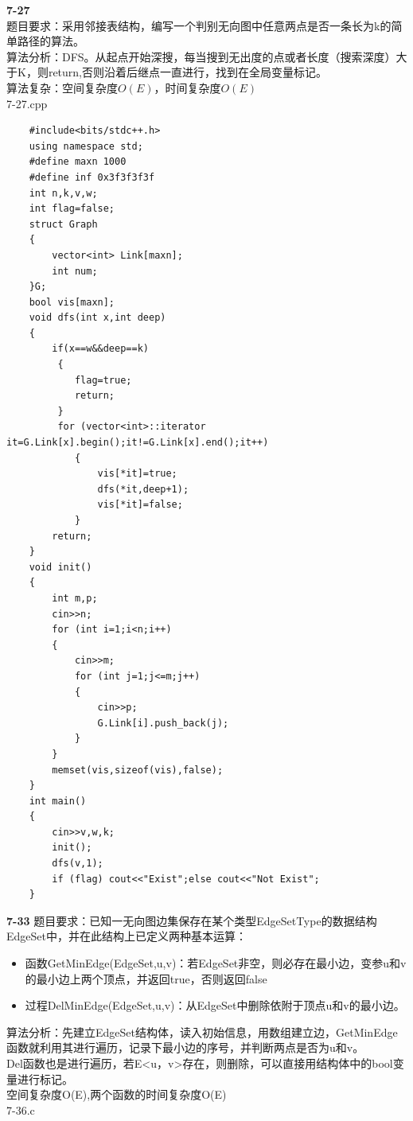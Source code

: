 \documentclass[UTF8,a4paper]{article}
\begin{document}
\textbf{7-27}\\
题目要求：采用邻接表结构，编写一个判别无向图中任意两点是否一条长为k的简单路径的算法。\\
算法分析：DFS。从起点开始深搜，每当搜到无出度的点或者长度（搜索深度）大于K，则return,否则沿着后继点一直进行，找到在全局变量标记。\\
算法复杂：空间复杂度$O(E)$，时间复杂度$O(E)$\\
7-27.cpp
\begin{lstlisting}
    #include<bits/stdc++.h>
    using namespace std;
    #define maxn 1000
    #define inf 0x3f3f3f3f
    int n,k,v,w;
    int flag=false;
    struct Graph
    {
        vector<int> Link[maxn];
        int num;
    }G;
    bool vis[maxn];
    void dfs(int x,int deep)
    {
        if(x==w&&deep==k) 
         {
            flag=true;
            return;
         }
         for (vector<int>::iterator it=G.Link[x].begin();it!=G.Link[x].end();it++)
            {
                vis[*it]=true;
                dfs(*it,deep+1);
                vis[*it]=false;
            }
        return;
    }
    void init()
    {
        int m,p;
        cin>>n;
        for (int i=1;i<n;i++)
        {
            cin>>m;
            for (int j=1;j<=m;j++)
            {
                cin>>p;
                G.Link[i].push_back(j);
            }
        }
        memset(vis,sizeof(vis),false);
    }
    int main()
    {
        cin>>v,w,k;
        init();
        dfs(v,1);
        if (flag) cout<<"Exist";else cout<<"Not Exist";
    }    
\end{lstlisting}
\textbf{7-33}
题目要求：已知一无向图边集保存在某个类型EdgeSetType的数据结构EdgeSet中，并在此结构上已定义两种基本运算：
\begin{itemize}
    \item 函数GetMinEdge(EdgeSet,u,v)：若EdgeSet非空，则必存在最小边，变参u和v的最小边上两个顶点，并返回true，否则返回false
    \item 过程DelMinEdge(EdgeSet,u,v)：从EdgeSet中删除依附于顶点u和v的最小边。 
\end{itemize}
算法分析：先建立EdgeSet结构体，读入初始信息，用数组建立边，GetMinEdge函数就利用其进行遍历，记录下最小边的序号，并判断两点是否为u和v。\\
Del函数也是进行遍历，若E<u，v>存在，则删除，可以直接用结构体中的bool变量进行标记。\\
空间复杂度O(E),两个函数的时间复杂度O(E)\\
7-36.c
\end{document}
